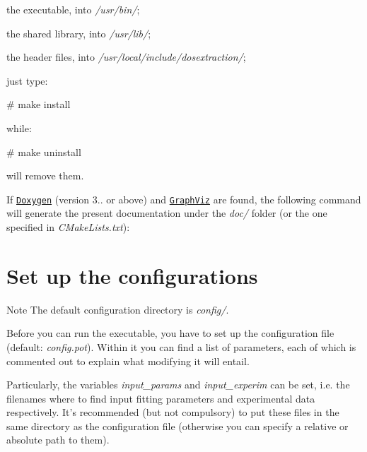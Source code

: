 \begin{DoxyItemize}
\item the executable, into {\itshape /usr/bin/}; \item the shared library, into {\itshape /usr/lib/}; \item the header files, into {\itshape /usr/local/include/dosextraction/};\end{DoxyItemize}
just type\-:


\begin{DoxyCode}
\textcolor{preprocessor}{# make install}
\end{DoxyCode}


while\-:


\begin{DoxyCode}
\textcolor{preprocessor}{# make uninstall}
\end{DoxyCode}


will remove them. \par
 If \href{http://www.doxygen.org}{\tt Doxygen} (version 3.. or above) and \href{http://www.graphviz.org}{\tt Graph\-Viz} are found, the following command will generate the present documentation under the {\itshape doc/} folder (or the one specified in {\itshape C\-Make\-Lists.\-txt})\-:


\hypertarget{index_configure}{}\section{Set up the configurations}\label{index_configure}
\begin{DoxyNote}{Note}
The default configuration directory is {\itshape config/}.
\end{DoxyNote}
Before you can run the executable, you have to set up the configuration file (default\-: {\itshape config.\-pot}). Within it you can find a list of parameters, each of which is commented out to explain what modifying it will entail. \par
Particularly, the variables {\itshape input\-\_\-params} and {\itshape input\-\_\-experim} can be set, i.\-e. the filenames where to find input fitting parameters and experimental data respectively. It's recommended (but not compulsory) to put these files in the same directory as the configuration file (otherwise you can specify a relative or absolute path to them).

